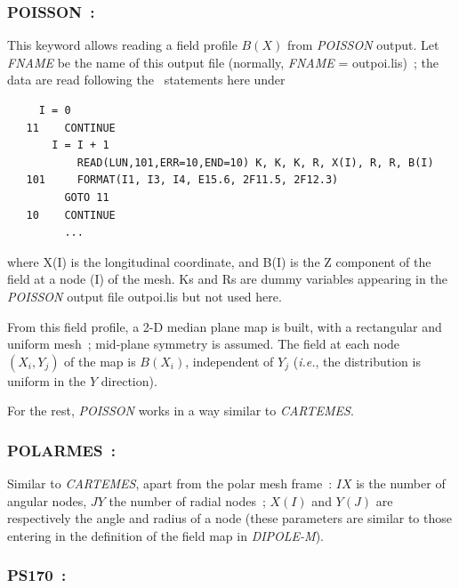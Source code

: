 \newpage

\subsubsection*{POISSON~:\POISSONTitl} \label{POISSON} 
\medskip 

This keyword allows reading a field profile $ B(X) $ from  \textsl{POISSON} output. 
Let \textsl{FNAME} be the name of this output file (normally,
\textsl{FNAME} = outpoi.lis)~; 
the data are read following the \FORTRAN\ statements here under 

{\footnotesize
\begin{verbatim}
	 I = 0
   11    CONTINUE
	   I = I + 1
           READ(LUN,101,ERR=10,END=10) K, K, K, R, X(I), R, R, B(I) 
   101     FORMAT(I1, I3, I4, E15.6, 2F11.5, 2F12.3)
         GOTO 11     
   10    CONTINUE
         ...
\end{verbatim}}
\medskip
 
\noindent where X(I) is the longitudinal coordinate, and B(I) is the Z
component of the field at a node (I) of the mesh. Ks and Rs are dummy variables 
appearing in the \textsl{POISSON} output file outpoi.lis
 but not used here. 
\medskip

\noindent From this field profile, a 2-D median plane map is built, with a 
rectangular and uniform mesh~; mid-plane symmetry is assumed. The field at 
each node $ (X_i,Y_j) $ of the map is $ B(X_i) $, independent of $ Y_j $
(\emph{i.e.}, the distribution is uniform in the $ Y $ direction).  
\medskip

\noindent For the rest, \textsl{POISSON} works in a way similar to \textsl{CARTEMES}. 

\newpage
\subsubsection*{POLARMES~: \POLARMESTitl} \label{POLARMES} 
\medskip 

Similar to \textsl{CARTEMES}, apart from the polar 
mesh frame~: $IX$ is the number of angular nodes, $JY$ the number of 
radial nodes~; $X(I)$ and $Y(J)$ are respectively the angle and radius 
of a node (these parameters are similar to those entering in the 
definition of the field map in \textsl{DIPOLE-M}).

\newpage

\subsubsection*{PS170~: \PSusoTitl} \label{PS170} 
\medskip 

